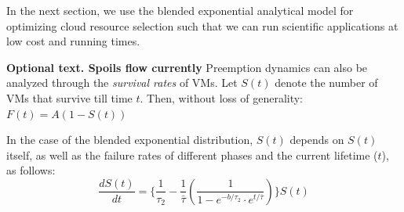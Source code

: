 In the next section, we use the blended exponential analytical model for optimizing cloud resource selection such that we can run scientific applications at low cost and running times.




\textbf{Optional text. Spoils flow currently}
Preemption dynamics can also be analyzed through the \emph{survival rates} of VMs.
Let $S(t)$ denote the number of VMs that survive till time $t$.
Then, without loss of generality: $F(t) = A(1-S(t))$

In the case of the blended exponential distribution, $S(t)$ depends on $S(t)$ itself, as well as the failure rates of different phases and the current lifetime ($t$), as follows:
\begin{equation}
  \label{eq:ramanujan}
  \dfrac{dS(t)}{dt} = \{\dfrac{1}{\tau_2} - \dfrac{1}{\bar{\tau}}(\dfrac{1}{1-e^{-b/\tau_2} \cdot e^{t/\bar{\tau}}}) \}S(t)
\end{equation}











